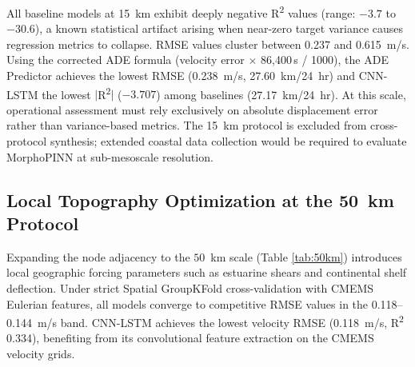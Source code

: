 \documentclass[conference]{IEEEtran}
\begin{document}
All baseline models at 15~km exhibit deeply negative R\textsuperscript{2} values (range: $-3.7$ to $-30.6$), a known statistical artifact arising when near-zero target variance causes regression metrics to collapse. RMSE values cluster between 0.237 and 0.615~m/s. Using the corrected ADE formula (velocity error $\times$ 86,400\,s / 1000), the ADE Predictor achieves the lowest RMSE (0.238~m/s, 27.60~km/24~hr) and CNN-LSTM the lowest $|$R\textsuperscript{2}$|$ ($-3.707$) among baselines (27.17~km/24~hr). At this scale, operational assessment must rely exclusively on absolute displacement error rather than variance-based metrics. The 15~km protocol is excluded from cross-protocol synthesis; extended coastal data collection would be required to evaluate MorphoPINN at sub-mesoscale resolution.

\subsection{Local Topography Optimization at the 50~km Protocol}

\begin{table}[htbp]
\caption{Trajectory Divergence at the 50~km Protocol Boundary}
\label{tab:50km}
\begin{center}
\end{center}
\end{table}

Expanding the node adjacency to the $50$~km scale (Table \ref{tab:50km}) introduces local geographic forcing parameters such as estuarine shears and continental shelf deflection. Under strict Spatial GroupKFold cross-validation with CMEMS Eulerian features, all models converge to competitive RMSE values in the 0.118--0.144~m/s band. CNN-LSTM achieves the lowest velocity RMSE (0.118~m/s, R\textsuperscript{2} 0.334), benefiting from its convolutional feature extraction on the CMEMS velocity grids.
\end{document}
